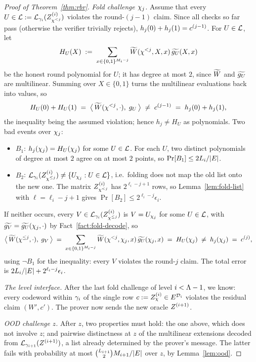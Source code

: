 \begin{proof}[Proof of Theorem~\ref{thm:rbr}]
\medskip\noindent\emph{Fold challenge $\chi_j$.}
Assume that every $U \in \mathcal{L} := \mathcal{L}_{\gamma_i}(Z^{(i)}_{\chi^{<j}})$ violates the round-$(j{-}1)$ claim. Since all checks so far pass (otherwise the verifier trivially rejects), $h_j(0) + h_j(1) = c^{(j-1)}$. For $U \in \mathcal{L}$, let
\[
H_U(X) \;:=\; \sum_{x \in \{0,1\}^{M_i - j}} \widetilde{W}(\chi^{<j}, X, x)\, \widetilde{g_U}(X, x)
\]
be the honest round polynomial for $U$; it has degree at most $2$, since $\widetilde{W}$ and $\widetilde{g_U}$ are multilinear. Summing over $X \in \{0, 1\}$ turns the multilinear evaluations back into values, so
\[
H_U(0) + H_U(1) \;=\; \bigl\langle\, \widetilde{W}(\chi^{<j}, \cdot),\; g_U \,\bigr\rangle \;\neq\; c^{(j-1)} \;=\; h_j(0) + h_j(1),
\]
the inequality being the assumed violation; hence $h_j \neq H_U$ as polynomials. Two bad events over $\chi_j$:
\begin{itemize}[itemsep=1pt]
\item $B_1$: $h_j(\chi_j) = H_U(\chi_j)$ for some $U \in \mathcal{L}$. For each $U$, two distinct polynomials of degree at most $2$ agree on at most $2$ points, so $\Pr[B_1] \le 2 L_i / |E|$.
\item $B_2$: $\mathcal{L}_{\gamma_i}(Z^{(i)}_{\chi^{\le j}}) \neq \{ U_{\chi_j} : U \in \mathcal{L} \}$, i.e.\ folding does not map the old list onto the new one. The matrix $Z^{(i)}_{\chi^{<j}}$ has $2^{\ell_i - j + 1}$ rows, so Lemma~\ref{lem:fold-list} with $\ell = \ell_i - j + 1$ gives $\Pr[B_2] \le 2^{\ell_i - j} \epsilon_i$.
\end{itemize}
If neither occurs, every $V \in \mathcal{L}_{\gamma_i}(Z^{(i)}_{\chi^{\le j}})$ is $V = U_{\chi_j}$ for some $U \in \mathcal{L}$, with $\widetilde{g_V} = \widetilde{g_U}(\chi_j, \cdot)$ by Fact~\ref{fact:fold-decode}, so
\[
\bigl\langle\, \widetilde{W}(\chi^{\le j}, \cdot),\; g_V \,\bigr\rangle
\;=\; \sum_{x \in \{0,1\}^{M_i - j}} \widetilde{W}(\chi^{<j}, \chi_j, x)\, \widetilde{g_U}(\chi_j, x)
\;=\; H_U(\chi_j) \;\neq\; h_j(\chi_j) \;=\; c^{(j)} ,
\]
using $\neg B_1$ for the inequality: every $V$ violates the round-$j$ claim. The total error is $2 L_i/|E| + 2^{\ell_i - j} \epsilon_i$.

\medskip\noindent\emph{The level interface.}
After the last fold challenge of level $i < \Lambda - 1$, we know: every codeword within $\gamma_i$ of the single row $c := Z^{(i)}_\chi \in E^{\mathcal{D}_i}$ violates the residual claim $(W', c')$. The prover now sends the new oracle $Z^{(i+1)}$.

\medskip\noindent\emph{OOD challenge $z$.}
After $z$, two properties must hold: the one above, which does not involve $z$; and pairwise distinctness at $z$ of the multilinear extensions decoded from $\mathcal{L}_{\gamma_{i+1}}(Z^{(i+1)})$, a list already determined by the prover's message. The latter fails with probability at most $\binom{L_{i+1}}{2} M_{i+1} / |E|$ over $z$, by Lemma~\ref{lem:ood}.


\end{proof}
